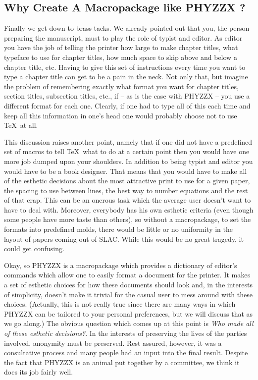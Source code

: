 \subsection{Why Create A Macropackage like PHYZZX ?}
 
Finally we get down to brass tacks.
We already pointed out that you, the person preparing the
manuscript, must to play the role of typist and editor.
As editor you have the job of telling the printer how large to
make chapter titles, what typeface to use for chapter titles,
how much space to skip above and below a chapter title, etc.
Having to give this set of instructions every time you want to
type a chapter title can get to be a pain in the neck.
Not only that, but imagine the problem of remembering exactly what
format you want for chapter titles, section titles, subsection
titles, etc., if -- as is the case with PHYZZX -- you use a different
format for each one.
Clearly, if one had to type all of this each time and keep all this
information in one's head one would probably choose not to use
\TeX\ at all.
 
This discussion raises another point, namely that if one did
not have a predefined set of macros to tell \TeX\ what to
do at a certain point then you would have one more job dumped upon
your shoulders.
In addition to being typist and editor you would have to be a book
designer.
That means that you would have to make all of the esthetic decisions
about the most attractive print to use for a given paper, the spacing
to use between lines, the best way to number equations and
the rest of that crap.
This can be an onerous task which the average user doesn't want to
have to deal with.
Moreover, everybody has his own esthetic criteria (even though some
people have more taste than others), so without
a macropackage, to
set the formats into predefined molds, there would be little
or no uniformity in the layout of papers coming out of SLAC.
While this would be no great tragedy, it could get confusing.
 
Okay, so PHYZZX is a macropackage which provides a dictionary
of editor's commands which allow one to easily format a
document for the printer.
It makes a set of esthetic choices for how these documents should
look and, in the interests of simplicity, doesn't make it trivial
for the casual user to mess around with these choices.
(Actually, this is not really true since there are many
ways in which PHYZZX can be tailored to your personal preferences,
but we will discuss that as we go along.)
The obvious question which comes up at this point is {\it Who
made all of these esthetic decisions?\/}.
In the interests of preserving the lives of the parties involved,
anonymity must be preserved.
Rest assured, however, it was a consultative process
and many people had an input into the final result.
Despite the fact that PHYZZX is an animal put together
by a committee, we think it does its job fairly well.
 
